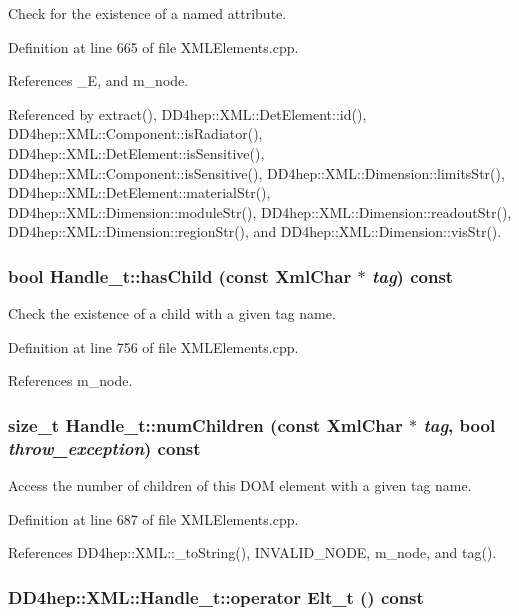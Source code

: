 Check for the existence of a named attribute. 

Definition at line 665 of file XMLElements.cpp.

References \_\-E, and m\_\-node.

Referenced by extract(), DD4hep::XML::DetElement::id(), DD4hep::XML::Component::isRadiator(), DD4hep::XML::DetElement::isSensitive(), DD4hep::XML::Component::isSensitive(), DD4hep::XML::Dimension::limitsStr(), DD4hep::XML::DetElement::materialStr(), DD4hep::XML::Dimension::moduleStr(), DD4hep::XML::Dimension::readoutStr(), DD4hep::XML::Dimension::regionStr(), and DD4hep::XML::Dimension::visStr().\hypertarget{class_d_d4hep_1_1_x_m_l_1_1_handle__t_a6afc1540a4e5fdca604b27a945a8771c}{
\subsubsection[{hasChild}]{\setlength{\rightskip}{0pt plus 5cm}bool Handle\_\-t::hasChild (const {\bf XmlChar} $\ast$ {\em tag}) const}}
\label{class_d_d4hep_1_1_x_m_l_1_1_handle__t_a6afc1540a4e5fdca604b27a945a8771c}


Check the existence of a child with a given tag name. 

Definition at line 756 of file XMLElements.cpp.

References m\_\-node.\hypertarget{class_d_d4hep_1_1_x_m_l_1_1_handle__t_aac8ea5266db9275f16c31be61d59fd2a}{
\subsubsection[{numChildren}]{\setlength{\rightskip}{0pt plus 5cm}size\_\-t Handle\_\-t::numChildren (const {\bf XmlChar} $\ast$ {\em tag}, \/  bool {\em throw\_\-exception}) const}}
\label{class_d_d4hep_1_1_x_m_l_1_1_handle__t_aac8ea5266db9275f16c31be61d59fd2a}


Access the number of children of this DOM element with a given tag name. 

Definition at line 687 of file XMLElements.cpp.

References DD4hep::XML::\_\-toString(), INVALID\_\-NODE, m\_\-node, and tag().\hypertarget{class_d_d4hep_1_1_x_m_l_1_1_handle__t_a74d545cef7f7bf5b897ea469e877f6fb}{
\subsubsection[{operator Elt\_\-t}]{\setlength{\rightskip}{0pt plus 5cm}DD4hep::XML::Handle\_\-t::operator {\bf Elt\_\-t} () const}}
\label{class_d_d4hep_1_1_x_m_l_1_1_handle__t_a74d545cef7f7bf5b897ea469e877f6fb}



